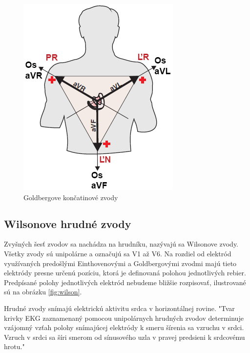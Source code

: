 \begin{figure}[H]
    \centering
    \includegraphics[scale=0.5]{img/goldberger-leads.png}
    \caption{Goldbergove končatinové zvody\cite{Blahút_2017a}}
    \label{fig:goldberg}
\end{figure}

\subsection{Wilsonove hrudné zvody}

Zvyšných šesť zvodov sa nachádza na hrudníku, nazývajú sa Wilsonove zvody. Všetky zvody sú unipolárne a označujú sa V1 až V6. Na rozdiel od elektród využívaných predošlými Einthovenovými a Goldbergovými zvodmi majú tieto elektródy presne určenú pozíciu, ktorá je definovaná polohou jednotlivých rebier.\cite{Bada2010}\cite{garcia201512} Predpísané polohy jednotlivých elektród nebudeme bližšie rozpisovať, ilustrované sú na obrázku \ref{fig:wilson}.

Hrudné zvody snímajú elektrickú aktivitu srdca v horizontálnej rovine. "Tvar krivky EKG zaznamenaný pomocou unipolárnych hrudných zvodov determinuje vzájomný vzťah polohy snímajúcej elektródy k smeru šírenia sa vzruchu v srdci. Vzruch v srdci sa šíri smerom od sínusového uzla v pravej predsieni k srdcovému hrotu."\cite{Bada2010}

